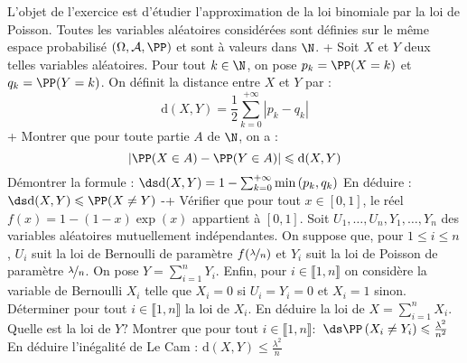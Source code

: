 \begin{exercise}[title=Inégalité de Le Cam]
L'objet de l'exercice est d'étudier l'approximation de la loi binomiale par la loi de Poisson. Toutes les variables aléatoires considérées sont définies sur le même espace probabilisé $(\Omega, \mathcal{A}, \PP)$ et sont à valeurs dans $\N$.
\question+ Soit $X$ et $Y$ deux telles variables aléatoires. Pour tout $k \in \N$, on pose $p_{k}=\PP(X=k)$ et $q_{k}=\PP(Y=k)$. On définit la distance entre $X$ et $Y$ par :
\begin{equation*}
\mathrm{d}(X, Y)=\frac{1}{2} \sum_{k=0}^{+\infty}\left|p_{k}-q_{k}\right|
\end{equation*}
\question+ Montrer que pour toute partie $A$ de $\N$, on a :
\begin{equation*}
|\PP(X \in A)-\PP(Y \in A)| \leqslant \mathrm{d}(X, Y)
\end{equation*}
\question Démontrer la formule :
$\ds\mathrm{d}(X, Y)=1-\sum_{k=0}^{+\infty} \min \left(p_{k}, q_{k}\right)$
\question En déduire :
$\ds\mathrm{d}(X, Y) \leqslant \PP(X \neq Y)$
\question-\question+ Vérifier que pour tout $x \in[0,1]$, le réel $f(x)=1-(1-x) \exp (x)$ appartient à $[0,1]$. Soit $U_{1}, \ldots, U_{n}, Y_{1}, \ldots, Y_{n}$ des variables aléatoires mutuellement indépendantes. On suppose que, pour $1 \leqslant i \leqslant n$, $U_{i}$ suit la loi de Bernoulli de paramètre $f(\nicefrac{\lambda}{n})$ et $Y_{i}$ suit la loi de Poisson de paramètre $\nicefrac{\lambda}{n}$. On pose $Y=\sum_{i=1}^{n} Y_{i}$. Enfin, pour $i \in \llbracket 1, n \rrbracket$ on considère la variable de Bernoulli $X_{i}$ telle que $X_{i}=0$ si $U_{i}=Y_{i}=0$ et $X_{i}=1$ sinon.
\question Déterminer pour tout $i \in \llbracket 1, n \rrbracket$ la loi de $X_{i} $. En déduire la loi de $X=\sum_{i=1}^{n} X_{i}$. Quelle est la loi de $Y ?$
\question Montrer que pour tout $i \in \llbracket 1, n \rrbracket:$
$\ds\PP\left(X_{i} \neq Y_{i}\right) \leqslant \frac{\lambda^{2}}{n^{2}}$
\question En déduire l'inégalité de Le Cam :
$\mathrm{d}(X, Y) \leqslant \frac{\lambda^{2}}{n}$
\endquestions 
\end{exercise}


